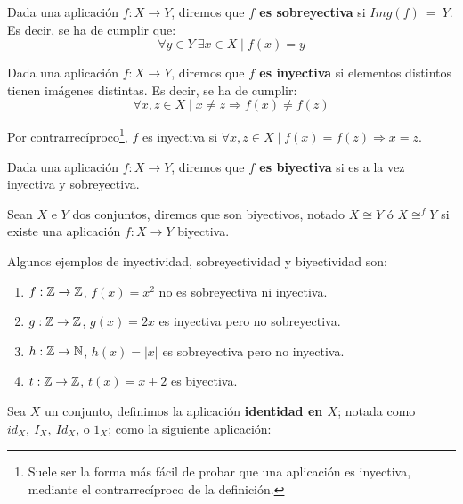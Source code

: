 \begin{definicion}[Sobreyectividad]
    Dada una aplicación $f:X \rightarrow Y$, diremos que \textbf{$f$ es sobreyectiva} si $Img(f)~=~Y$. Es decir, se ha de cumplir que:
    $$\forall y \in Y ~\exists x \in X \mid f(x) = y$$
\end{definicion}

\begin{definicion}[Inyectividad]
    Dada una aplicación $f:X \rightarrow Y$, diremos que \textbf{$f$ es inyectiva} si elementos distintos tienen imágenes distintas. Es decir, se ha de cumplir:
    $$\forall x,z \in X \mid x \neq z \Longrightarrow f(x) \neq f(z)$$
    
    Por contrarrecíproco\footnote{Suele ser la forma más fácil de probar que una aplicación es inyectiva, mediante el contrarrecíproco de la definición.}, $f$ es inyectiva si $\forall x,z \in X \mid f(x) = f(z) \Longrightarrow x = z$.
\end{definicion}

\begin{definicion}[Biyectividad]
    Dada una aplicación $f:X \rightarrow Y$, diremos que \textbf{$f$ es biyectiva} si es a la vez inyectiva y sobreyectiva.
\end{definicion}

\begin{definicion}
    Sean $X$ e $Y$ dos conjuntos, diremos que son biyectivos, notado $X \cong Y$ ó $\displaystyle X \mathop{\cong}^{f} Y$
    si existe una aplicación $f:X \rightarrow Y$ biyectiva.
\end{definicion}

\begin{ejemplo}
    Algunos ejemplos de inyectividad, sobreyectividad y biyectividad son:
    \begin{enumerate}
        \item $f:\mathbb{Z}\to\mathbb{Z}$, $f(x)=x^2$ no es sobreyectiva ni inyectiva.
        \item $g:\mathbb{Z}\to\mathbb{Z}$, $g(x)=2x$ es inyectiva pero no sobreyectiva.
        \item $h:\mathbb{Z}\to\mathbb{N}$, $h(x)=|x|$ es sobreyectiva pero no inyectiva.
        \item $t:\mathbb{Z}\to\mathbb{Z}$, $t(x)=x+2$ es biyectiva.
    \end{enumerate}
\end{ejemplo}

\begin{definicion}
    Sea $X$ un conjunto, definimos la aplicación \textbf{identidad en $X$}; notada como $id_X,~I_X,~Id_X$, o $1_X$; como la
    siguiente aplicación:
\end{definicion}

